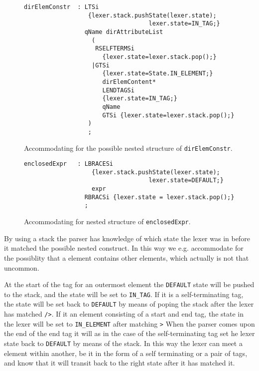 \begin{figure}[h!]
\begin{verbatim}
dirElemConstr  : LTSi 
                  {lexer.stack.pushState(lexer.state); 
                                   lexer.state=IN_TAG;}
                 qName dirAttributeList
                   (
                    RSELFTERMSi
                      {lexer.state=lexer.stack.pop();}
                   |GTSi 
                      {lexer.state=State.IN_ELEMENT;}
                      dirElemContent* 
                      LENDTAGSi 
                      {lexer.state=IN_TAG;}
                      qName 
                      GTSi {lexer.state=lexer.stack.pop();}
                  )
                  ;
\end{verbatim}
\caption[Accommodating for a nested structure of \texttt{dirElemConstr}]{Accommodating for the possible nested structure of \texttt{dirElemConstr}.}
\label{fig:nestedTransitionElement}
\end{figure}

\begin{figure}[h!]
\begin{verbatim}
enclosedExpr   : LBRACESi 
                   {lexer.stack.pushState(lexer.state); 
                                   lexer.state=DEFAULT;}
                   expr 
                 RBRACSi {lexer.state = lexer.stack.pop();}
                 ;
\end{verbatim}
\caption[Accommodating for nested structure of \texttt{enclosedExpr}]{Accommodating for nested structure of \texttt{enclosedExpr}.}
\label{fig:nestedTransitionExpr}
\end{figure}

By using a stack the parser has knowledge of which state the lexer was in before it matched the possible nested construct. In this way we e.g. accommodate for the possiblity that a element contains other elements, which actually is not that uncommon. 

At the start of the tag for an outermost element the \verb!DEFAULT! state will be pushed to the stack, and the state will be set to \verb!IN_TAG!. If it is a self-terminating tag, the state will be set back to \verb!DEFAULT! by means of poping the stack after the lexer has matched \verb!/>!. If it an element consisting of a start and end tag, the state in the lexer will be set to \verb!IN_ELEMENT! after matching \verb!>! When the parser comes upon the end of the end tag it will as in the case of the self-terminating tag set he lexer state back to \verb!DEFAULT! by means of the stack. In this way the lexer can meet a element within another, be it in the form of a self terminating or a pair of tags, and know that it will transit back to the right state after it has matched it.


